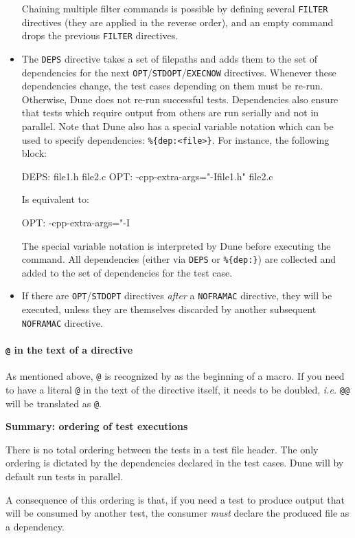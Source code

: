 \begin{itemize}
\begin{code}
  \end{code}
  Chaining multiple filter commands is possible by defining several \texttt{FILTER} directives (they are applied in the reverse order),
  and an empty command drops the previous \texttt{FILTER} directives.
\item The \texttt{DEPS} directive takes a set
  of filepaths and adds them to the set of dependencies for the next
  \texttt{OPT}/\texttt{STDOPT}/\texttt{EXECNOW} directives.
  Whenever these dependencies change, the test
  cases depending on them must be re-run. Otherwise, Dune does not re-run
  successful tests. Dependencies also ensure that tests which require output
  from others are run serially and not in parallel.
  Note that Dune also has a special variable notation which can be used to
  specify dependencies: \verb|%{dep:<file>}|. For instance, the following
    block:
    \begin{code}
      DEPS: file1.h file2.c
      OPT: -cpp-extra-args="-Ifile1.h" file2.c
    \end{code}
    Is equivalent to:
    \begin{code}
      OPT: -cpp-extra-args="-I%
    \end{code}
    The special variable notation is interpreted by Dune before executing the
    command. All dependencies (either via \texttt{DEPS} or \verb|%{dep:}|) are
    collected and added to the set of dependencies for the test case.
\item
  If there are \texttt{OPT}/\texttt{STDOPT} directives \textit{after} a
  \texttt{NOFRAMAC} directive, they will be executed, unless
  they are themselves discarded by another subsequent \texttt{NOFRAMAC}
  directive.
\end{itemize}

\begin{important}
\paragraph{\texttt{@} in the text of a directive}
As mentioned above, \texttt{@} is recognized by \ptests as the beginning of
a macro. If you need to have a literal \texttt{@} in the text of the directive
itself, it needs to be doubled, {\it i.e.} \texttt{@@} will be translated as
\texttt{@}.
\end{important}

\begin{important}
  \textbf{Summary: ordering of test executions}

  There is no total ordering between the tests in a test file header.
  The only ordering is dictated by the dependencies declared in the test cases.
  Dune will by default run tests in parallel.

  A consequence of this ordering is that, if you need a test to produce output
  that will be consumed by another test, the consumer \emph{must} declare the
  produced file as a dependency.
\end{important}

